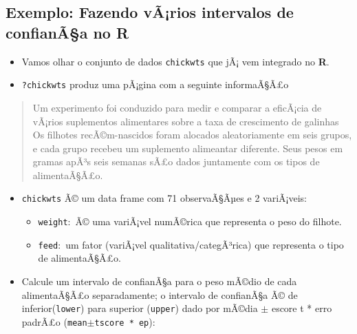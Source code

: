 \documentclass[]{article}
\providecommand{\tightlist}{%
  \setlength{\itemsep}{0pt}\setlength{\parskip}{0pt}}
\begin{document}
\subsection{\texorpdfstring{Exemplo: Fazendo vÃ¡rios intervalos de
confianÃ§a no
\textbf{R}}{Exemplo: Fazendo vÃ¡rios intervalos de confianÃ§a no R}}\label{exemplo-fazendo-varios-intervalos-de-confianaa-no-r}

\begin{itemize}
\tightlist
\item
  Vamos olhar o conjunto de dados \texttt{chickwts} que jÃ¡ vem
  integrado no \textbf{R}.
\item
  \texttt{?chickwts} produz uma pÃ¡gina com a seguinte informaÃ§Ã£o
\end{itemize}

\begin{quote}
Um experimento foi conduzido para medir e comparar a eficÃ¡cia de
vÃ¡rios suplementos alimentares sobre a taxa de crescimento de galinhas
Os filhotes recÃ©m-nascidos foram alocados aleatoriamente em seis
grupos, e cada grupo recebeu um suplemento alimeantar diferente. Seus
pesos em gramas apÃ³s seis semanas sÃ£o dados juntamente com os tipos de
alimentaÃ§Ã£o.
\end{quote}

\begin{itemize}
\tightlist
\item
  \texttt{chickwts} Ã© um data frame com 71 observaÃ§Ãµes e 2
  variÃ¡veis:

  \begin{itemize}
  \tightlist
  \item
    \texttt{weight}:~Ã© uma variÃ¡vel numÃ©rica que representa o peso do
    filhote.
  \item
    \texttt{feed}:~um fator (variÃ¡vel qualitativa/categÃ³rica) que
    representa o tipo de alimentaÃ§Ã£o.
  \end{itemize}
\item
  Calcule um intervalo de confianÃ§a para o peso mÃ©dio de cada
  alimentaÃ§Ã£o separadamente; o intervalo de confianÃ§a Ã© de
  inferior(\texttt{lower}) para superior (\texttt{upper}) dado por
  mÃ©dia \(\pm\) escore t * erro padrÃ£o
  (\texttt{mean}\(\pm\)\texttt{tscore\ *\ ep}):
\end{itemize}
\end{document}
